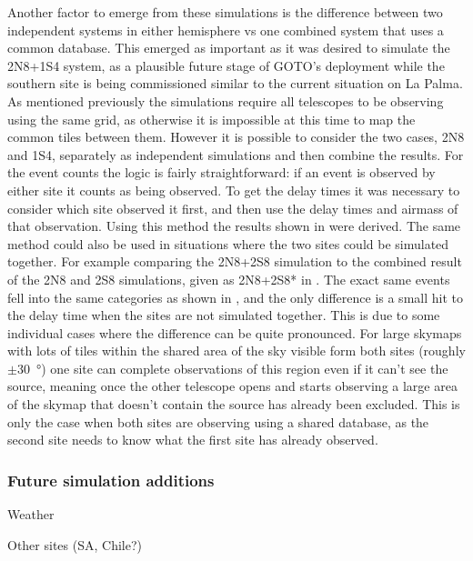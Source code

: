 \begin{colsection}
\begin{colsection}
Another factor to emerge from these simulations is the difference between two independent systems in either hemisphere vs one combined system that uses a common database. This emerged as important as it was desired to simulate the 2N8+1S4 system, as a plausible future stage of GOTO's deployment while the southern site is being commissioned similar to the current situation on La Palma. As mentioned previously the simulations require all telescopes to be observing using the same grid, as otherwise it is impossible at this time to map the common tiles between them. However it is possible to consider the two cases, 2N8 and 1S4, separately as independent simulations and then combine the results. For the event counts the logic is fairly straightforward: if an event is observed by either site it counts as being observed. To get the delay times it was necessary to consider which site observed it first, and then use the delay times and airmass of that observation. Using this method the results shown in  were derived. The same method could also be used in situations where the two sites could be simulated together. For example comparing the 2N8+2S8 simulation to the combined result of the 2N8 and 2S8 simulations, given as 2N8+2S8* in . The exact same events fell into the same categories as shown in , and the only difference is a small hit to the delay time when the sites are not simulated together. This is due to some individual cases where the difference can be quite pronounced. For large skymaps with lots of tiles within the shared area of the sky visible form both sites (roughly $\pm$\SI{30}{\degree}) one site can complete observations of this region even if it can't see the source, meaning once the other telescope opens and starts observing a large area of the skymap that doesn't contain the source has already been excluded. This is only the case when both sites are observing using a shared database, as the second site needs to know what the first site has already observed.

\subsubsection{Future simulation additions}

Weather

Other sites (SA, Chile?)

\end{colsection}

\newpage

\end{colsection}
